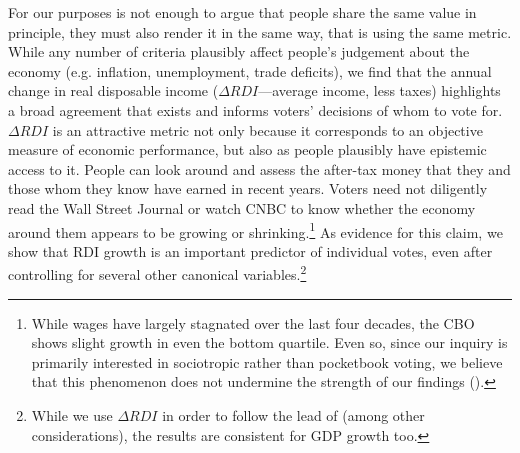 \documentclass[11pt]{article}
\begin{document}
For our purposes is not enough to argue that people share the same value in principle, they must also render it in the same way, that is using the same metric. While any number of criteria plausibly affect people's judgement about the economy (e.g. inflation, unemployment, trade deficits), we find that the annual change in real disposable income ($\Delta RDI$---average income, less taxes) highlights a broad agreement that exists and informs voters' decisions of whom to vote for. $\Delta RDI$ is an attractive metric not only because it corresponds to an objective measure of economic performance, but also as people plausibly have epistemic access to it. People can look around and assess the after-tax money that they and those whom they know have earned in recent years. Voters need not diligently read the Wall Street Journal or watch CNBC to know whether the economy around them appears to be growing or shrinking.\footnote{While wages have largely stagnated over the last four decades, the CBO shows slight growth in even the bottom quartile. Even so, since our inquiry is primarily interested in sociotropic rather than pocketbook voting, we believe that this phenomenon does not undermine the strength of our findings (\cite{congress2011trends}).} %
As evidence for this claim, we show that RDI growth is an important predictor of individual votes, even after controlling for several other canonical variables.\footnote{While we use $\Delta RDI$ in order to follow the lead of \citet{Nadeau:2001tw} (among other considerations), the results are consistent for GDP growth too.}
\end{document}
